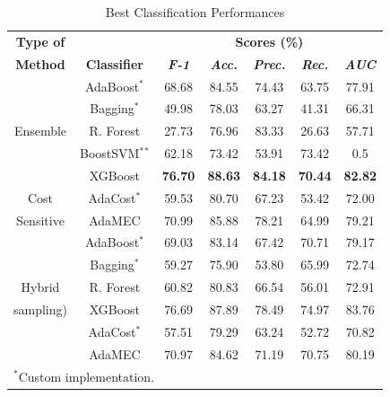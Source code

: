 \documentclass[conference]{IEEEtran}
\begin{document}
\begin{table}[htbp]
\caption{Best Classification Performances}

\begin{center}

\begin{tabular}{|c|c|c|c|c|c|c|}

\hline
\textbf{Type of} & & \multicolumn{5}{|c|}{\textbf{Scores (\%)}} \\
\cline{3-7}

\textbf{Method} & \textbf{Classifier} &\textbf{\textit{F-1}}& \textbf{\textit{Acc.}}&\textbf{\textit{Prec.}}&\textbf{\textit{Rec.}}&\textbf{\textit{AUC}}\\
\hline

& AdaBoost$^*$ &68.68&84.55&74.43&63.75&77.91  \\
\cline{2-7}

& Bagging$^*$ &49.98&78.03&63.27&41.31&66.31  \\
\cline{2-7}

Ensemble & R. Forest &27.73&76.96&83.33&26.63&57.71  \\
\cline{2-7}

& BoostSVM$^*$$^*$ &62.18&73.42&53.91&73.42&0.5  \\
\cline{2-7}

& XGBoost  &\textbf{76.70}&\textbf{88.63}&\textbf{84.18}&\textbf{70.44}&\textbf{82.82} \\
\hline

Cost & AdaCost$^*$ &59.53&80.70&67.23&53.42&72.00  \\
\cline{2-7}

Sensitive& AdaMEC &70.99&85.88&78.21&64.99&79.21  \\
\hline

& AdaBoost$^*$ &69.03&83.14&67.42&70.71&79.17  \\
\cline{2-7}

& Bagging$^*$ &59.27&75.90&53.80&65.99&72.74  \\
\cline{2-7}

Hybrid & R. Forest &60.82&80.83&66.54&56.01&72.91  \\
\cline{2-7}

sampling)& XGBoost  &76.69&87.89&78.49&74.97&83.76 \\
\cline{2-7}

 & AdaCost$^*$ &57.51&79.29&63.24&52.72&70.82  \\
\cline{2-7}

& AdaMEC &70.97&84.62&71.19&70.75&80.19  \\
\hline

\multicolumn{4}{l}{$^{\mathrm{*}}$Custom implementation.}
\multicolumn{4}{l}{$^{\mathrm{*}}$$^{\mathrm{*}}$Metrics are weighted.}

\end{tabular}

\label{tab:PerformanceComparison}
\end{center}
\end{table}
\end{document}
